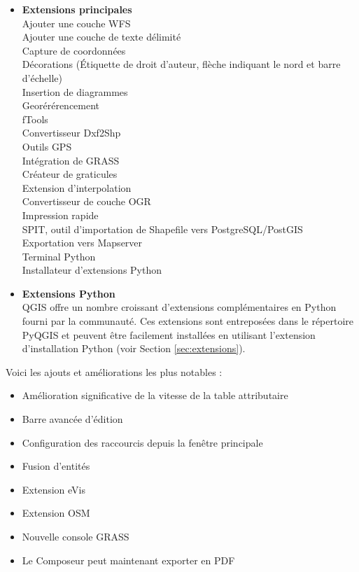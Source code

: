 \begin{itemize}
\item \textbf{Extensions principales}
\\  Ajouter une couche WFS 
\\ Ajouter une couche de texte délimité
\\ Capture de coordonnées
\\ Décorations (Étiquette de droit d'auteur, flèche indiquant le nord et barre d'échelle)
\\ Insertion de diagrammes
\\ Georérérencement
\\ fTools
\\ Convertisseur Dxf2Shp 
\\ Outils GPS 
\\ Intégration de GRASS
\\ Créateur de graticules
\\ Extension d'interpolation
\\ Convertisseur de couche OGR
\\ Impression rapide
\\ SPIT, outil d'importation de Shapefile vers PostgreSQL/PostGIS
\\ Exportation vers Mapserver
\\ Terminal Python
\\ Installateur d'extensions Python
\\ \item \textbf{Extensions Python}
\\ QGIS offre un nombre croissant d'extensions complémentaires en Python fourni par la communauté. Ces extensions sont entreposées dans le répertoire PyQGIS et peuvent être facilement installées en utilisant l'extension d'installation Python (voir Section \ref{sec:extensions}).
\end{itemize}

Voici les ajouts et améliorations les plus notables :

\begin{itemize}
\item Amélioration significative de la vitesse de la table attributaire
\item Barre avancée d'édition
\item Configuration des raccourcis depuis la fenêtre principale
\item Fusion d'entités 
\item Extension eVis
\item Extension OSM
\item Nouvelle console GRASS
\item Le Composeur peut maintenant exporter en PDF
\end{itemize}

